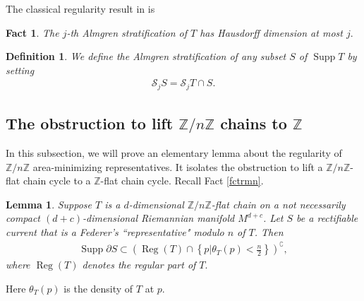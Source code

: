 \documentclass[11pt,a4paper]{amsart}
\numberwithin{equation}{section}
\newcommand{\supp}{\operatorname{Supp}}
\newcommand{\ta}{\theta}
\newcommand{\s}{\subset}
\newcommand{\cp}{^\complement}
\newcommand{\spt}{\operatorname{Supp}}
\newcommand{\pd}{\partial}
\newcommand{\Z}{\mathbb{Z}}
\theoremstyle{plain}
\newtheorem{lem}{Lemma}[subsection]
\newtheorem{fact}{Fact}[subsection]
\newtheorem{defn}{Definition}[subsection]
\theoremstyle{definition}
\numberwithin{equation}{subsection}
\begin{document}
	The classical regularity result in \cite{BWst} is
	\begin{fact}\label{fctas}
	The $j$-th Almgren stratification of $T$ has Hausdorff dimension at most $j.$
	\end{fact}
\begin{defn}
		We define the Almgren stratification of any subset $S$ of $\supp T$ by setting 
	\begin{align*}
		\mathcal{S}_jS=\mathcal{S}_jT\cap S.
	\end{align*}
\end{defn}		\subsection{The obstruction to lift $\Z/n\Z$ chains to $\Z$}\label{ssreg}
	In this subsection, we will prove an elementary lemma about the regularity of $\Z/n\Z$ area-minimizing representatives. It isolates the obstruction to lift a $\Z/n\Z$-flat chain cycle to a $\Z$-flat chain cycle. Recall Fact \ref{fctrmn}.
	\begin{lem}\label{lemdv}
		Suppose $T$ is a $d$-dimensional $\Z/n\Z$-flat chain on a not necessarily compact $(d+c)$-dimensional Riemannian manifold $M^{d+c}$. Let $S$ be a rectifiable current that is a Federer's ``representative" modulo $n$ of $T$. 
		Then
		\begin{align*}
			\spt\pd S\s \left(\operatorname{Reg}(T)\cap\left\{p\bigg|\ta_T(p)<\frac{n}{2}\right\}\right)\cp,
		\end{align*}where $\operatorname{Reg}(T)$ denotes the regular part of $T.$\end{lem}
	Here $\ta_T(p)$ is the density of $T$ at $p.$ 
\end{document}
